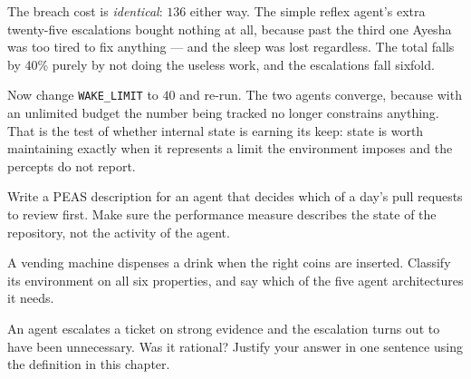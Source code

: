 \begin{lab}
\smallskip
The breach cost is \emph{identical}: $136$ either way. The simple reflex agent's
extra twenty-five escalations bought nothing at all, because past the third one
Ayesha was too tired to fix anything --- and the sleep was lost regardless. The
total falls by 40\% purely by not doing the useless work, and the escalations fall
sixfold.

Now change \texttt{WAKE\_LIMIT} to $40$ and re-run. The two agents converge,
because with an unlimited budget the number being tracked no longer constrains
anything. That is the test of whether internal state is earning its keep: state is
worth maintaining exactly when it represents a limit the environment imposes and
the percepts do not report.
\end{lab}

\begin{checkpoint}
\begin{tightnum}
  \item Write a PEAS description for an agent that decides which of a day's pull
        requests to review first. Make sure the performance measure describes the
        state of the repository, not the activity of the agent.
  \item A vending machine dispenses a drink when the right coins are inserted.
        Classify its environment on all six properties, and say which of the five
        agent architectures it needs.
  \item An agent escalates a ticket on strong evidence and the escalation turns
        out to have been unnecessary. Was it rational? Justify your answer in one
        sentence using the definition in this chapter.
\end{tightnum}
\end{checkpoint}

